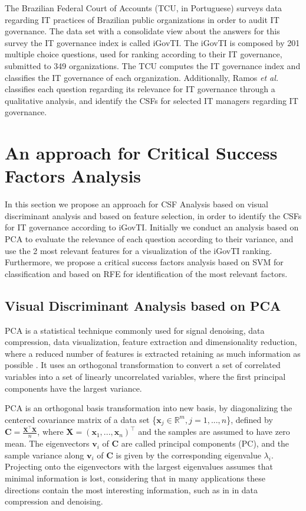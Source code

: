 The Brazilian Federal Court of Accounts (TCU, in Portuguese) surveys data regarding IT practices of Brazilian public organizations in order to audit IT governance. The data set with a consolidate view about the answers for this survey the IT governance index is called iGovTI. The iGovTI is composed by 201 multiple choice questions, used for ranking according to their IT governance, submitted to 349 organizations. The TCU computes the IT governance index and classifies the IT governance of each organization. Additionally, Ramos \emph{et al.}  classifies each question regarding its relevance for IT governance through a qualitative analysis, and identify the CSFs for selected IT managers regarding IT governance.


\section{An approach for Critical Success Factors Analysis}
\label{sec:b_csf_fs}

In this section we propose an approach for CSF Analysis based on visual discriminant analysis and based on feature selection, in order to identify the CSFs for IT governance according to iGovTI. Initially we conduct an analysis based on PCA to evaluate the relevance of each question according to their variance, and use the 2 most relevant features for a visualization of the iGovTI ranking. Furthermore, we propose a critical success factors analysis based on SVM for classification and based on RFE for identification of the most relevant factors.

\subsection{Visual Discriminant Analysis based on PCA}
\label{sec:b_pca}

PCA is a statistical technique commonly used for signal denoising, data compression, data visualization, feature extraction and dimensionality reduction, where a reduced number of features is extracted retaining as much information as possible \cite{jolliffe1986principal}. It uses an orthogonal transformation to convert a set of correlated variables into a set of linearly uncorrelated variables, where the first principal components have the largest variance.

PCA is an orthogonal basis transformation into new basis, by diagonalizing the centered covariance matrix of a data set \{$\mathbf{x}_j \in \mathbb{R}^m, j = 1, ... ,n$\}, defined by $\mathbf{C} = \frac{\mathbf{X}^\intercal\mathbf{X}}{n}$, where $\mathbf{X} = (\mathbf{x}_1, ... , \mathbf{x}_n)^\intercal$ and the samples are assumed to have zero mean. The eigenvectors $\mathbf{v}_i$ of $\mathbf{C}$ are called principal components (PC), and the sample variance along $\mathbf{v}_i$ of $\mathbf{C}$ is given by the corresponding eigenvalue $\lambda_i$. Projecting onto the eigenvectors with the largest eigenvalues assumes that minimal information is lost, considering that in many applications these directions contain the most interesting information, such as in in data compression and denoising.

